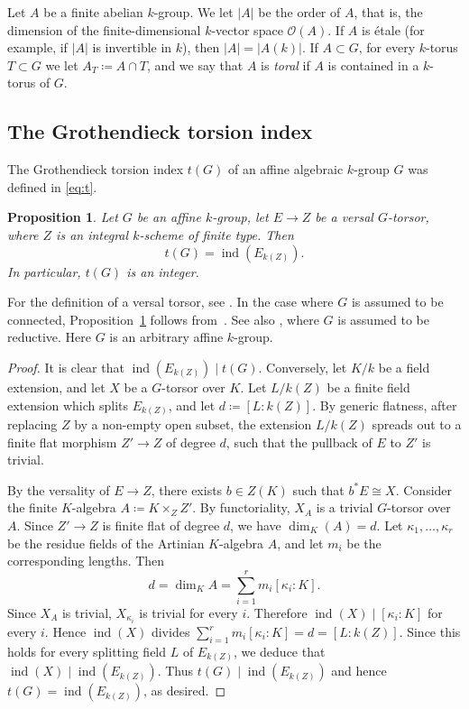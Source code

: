 \documentclass[12pt]{amsart}
\numberwithin{equation}{section}
\newtheorem{proposition}[theorem]{Proposition}
\theoremstyle{remark}
\newcommand{\ind}{\operatorname{ind}}
\begin{document}
Let $A$ be a finite abelian $k$-group.  We let $|A|$ be the order of $A$, that is, the dimension of the finite-dimensional $k$-vector space $\mathcal{O}(A)$. If $A$ is \'etale (for example, if $|A|$ is invertible in $k$), then $|A|=|A(k)|$. If $A\subset G$, for every $k$-torus $T\subset G$ we let $A_T\coloneqq A\cap T$, and we say that $A$ is \emph{toral} if $A$ is contained in a $k$-torus of $G$.


 \subsection{The Grothendieck torsion index}
The Grothendieck torsion index $t(G)$ of an affine algebraic $k$-group $G$ was defined in \eqref{eq:t}.

\begin{proposition} \label{prop:tG-well-defined}
   Let $G$ be an affine $k$-group, let $E \to Z$ be a versal $G$-torsor, where $Z$ is an integral $k$-scheme of finite type. Then
\[t(G) = \operatorname{ind}(E_{k(Z)}).\]
In particular, $t(G)$ is an integer.
\end{proposition}

For the definition of a versal torsor, see \cite[Definition 5.1]{serre-ci}. In the case where $G$ is assumed to be connected, Proposition~\ref{prop:tG-well-defined} follows from~\cite[Theorem 2]{grothendieck-special}. See also \cite[Theorem 1.1]{totaro-spin}, where $G$ is assumed to be reductive. Here $G$ is an arbitrary affine $k$-group.

\begin{proof}
It is clear that $\operatorname{ind}(E_{k(Z)}) \mid t(G)$. Conversely, let $K/k$ be a field extension, and let $X$ be a $G$-torsor over $K$. Let $L/k(Z)$ be a finite field extension which splits $E_{k(Z)}$, and let $d\coloneqq [L:k(Z)]$. By generic flatness, after replacing $Z$ by a non-empty open subset, the extension $L/k(Z)$ spreads out to a finite flat morphism $Z'\to Z$ of degree $d$, such that the pullback of $E$ to $Z'$ is trivial.

By the versality of $E\to Z$, there exists $b\in Z(K)$ such that $b^*E\cong X$. Consider the finite $K$-algebra $A \coloneqq K \times_Z Z'$. By functoriality, $X_A$ is a trivial $G$-torsor over $A$. Since $Z' \to Z$ is finite flat of degree $d$, we have $\dim_K(A)=d$.  Let $\kappa_1,\dots,\kappa_r$ be the residue fields of the Artinian $K$-algebra $A$, and let $m_i$ be the corresponding lengths. Then
\[
d = \dim_K A = \sum_{i=1}^r m_i [\kappa_i:K].
\]
Since $X_A$ is trivial, $X_{\kappa_i}$ is trivial for every $i$. Therefore $\operatorname{ind}(X) \mid [\kappa_i:K]$ for every $i$. Hence $\operatorname{ind}(X)$ divides $\sum_{i=1}^r m_i[\kappa_i:K] = d=[L:k(Z)]$. Since this holds for every splitting field $L$ of $E_{k(Z)}$, we deduce that $\ind(X)\mid \ind(E_{k(Z)})$. Thus $t(G)\mid \ind(E_{k(Z)})$ and hence $t(G)=\ind(E_{k(Z)})$, as desired.
\end{proof}
\end{document}
